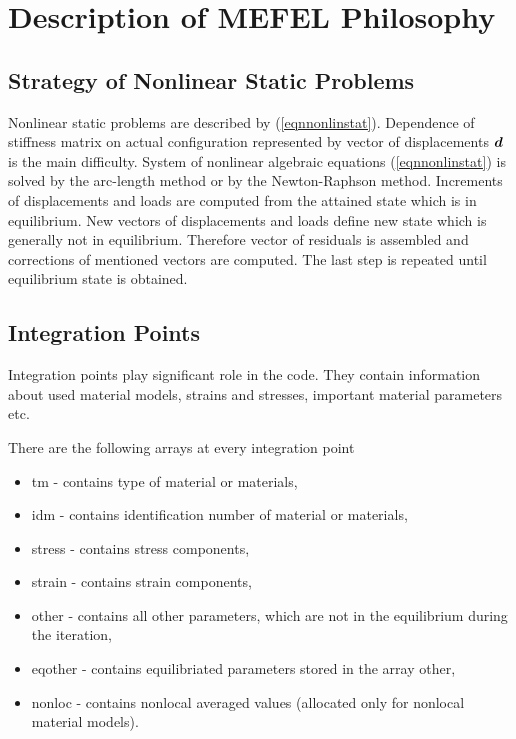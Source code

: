 \chapter{Description of MEFEL Philosophy}

\section{Strategy of Nonlinear Static Problems}

Nonlinear static problems are described by (\ref{eqnnonlinstat}). Dependence of stiffness matrix on actual
configuration represented by vector of displacements $\mbox{\boldmath$d$}$ is the main difficulty. System of nonlinear
algebraic equations (\ref{eqnnonlinstat}) is solved by the arc-length method or by the Newton-Raphson method.
Increments of displacements and loads are computed from the attained state which is in equilibrium. New
vectors of displacements and loads define new state which is generally not in equilibrium. Therefore vector
of residuals is assembled and corrections of mentioned vectors are computed. The last step is repeated until
equilibrium state is obtained.


\section{Integration Points}

Integration points play significant role in the code. They contain information about used material models,
strains and stresses, important material parameters etc.


There are the following arrays at every integration point
\begin{itemize}
\item{{\sf tm} - contains type of material or materials,}
\item{{\sf idm} - contains identification number of material or materials,}
\item{{\sf stress} - contains stress components,}
\item{{\sf strain} - contains strain components,}
\item{{\sf other} - contains all other parameters, which are not in the equilibrium during the iteration,}
\item{{\sf eqother} - contains equilibriated parameters stored in the array {\sf other},}
\item{{\sf nonloc} - contains nonlocal averaged values (allocated only for nonlocal material models).}
\end{itemize}

